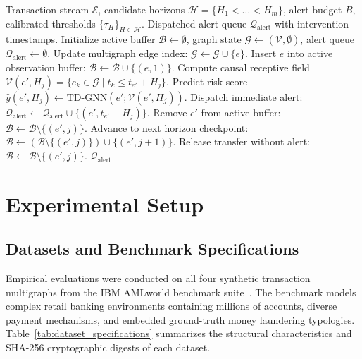 \documentclass[pdflatex,sn-mathphys,Numbered]{sn-jnl}
\theoremstyle{thmstyleone}
\theoremstyle{thmstyletwo}
\theoremstyle{thmstylethree}
\begin{document}
\begin{algorithm}[t]
\caption{Streaming Multi-Horizon Transaction Screening and Stoppable Alert Dispatching}
\label{alg:adaptive_screening}
\begin{algorithmic}[1]
\Require Transaction stream $\mathcal{E}$, candidate horizons $\mathcal{H}=\{H_1 < \dots < H_m\}$, alert budget $B$, calibrated thresholds $\{\tau_H\}_{H\in\mathcal{H}}$.
\Ensure Dispatched alert queue $\mathcal{Q}_{\text{alert}}$ with intervention timestamps.
\State Initialize active buffer $\mathcal{B} \gets \emptyset$, graph state $\mathcal{G} \gets (\mathcal{V}, \emptyset)$, alert queue $\mathcal{Q}_{\text{alert}} \gets \emptyset$.
    \State Update multigraph edge index: $\mathcal{G} \gets \mathcal{G} \cup \{e\}$.
    \State Insert $e$ into active observation buffer: $\mathcal{B} \gets \mathcal{B} \cup \{(e, 1)\}$. 
            \State Compute causal receptive field $\mathcal{V}(e', H_j) = \{e_k \in \mathcal{G} \mid t_k \le t_{e'} + H_j\}$.
            \State Predict risk score $\hat{y}(e', H_j) \gets \text{TD-GNN}(e'; \mathcal{V}(e', H_j))$.
                \State Dispatch immediate alert: $\mathcal{Q}_{\text{alert}} \gets \mathcal{Q}_{\text{alert}} \cup \{(e', t_{e'} + H_j)\}$.
                \State Remove $e'$ from active buffer: $\mathcal{B} \gets \mathcal{B} \setminus \{(e', j)\}$.
                \State Advance to next horizon checkpoint: $\mathcal{B} \gets (\mathcal{B} \setminus \{(e', j)\}) \cup \{(e', j+1)\}$.
            \Else
                \State Release transfer without alert: $\mathcal{B} \gets \mathcal{B} \setminus \{(e', j)\}$.
            \EndIf
        \EndIf
    \EndFor
\EndFor
\State \Return $\mathcal{Q}_{\text{alert}}$
\end{algorithmic}
\end{algorithm}

\section{Experimental Setup}
\label{sec:experimental_setup}

\subsection{Datasets and Benchmark Specifications}
Empirical evaluations were conducted on all four synthetic transaction multigraphs from the IBM AMLworld benchmark suite~\cite{altman2023ibmaml}. The benchmark models complex retail banking environments containing millions of accounts, diverse payment mechanisms, and embedded ground-truth money laundering typologies. Table~\ref{tab:dataset_specifications} summarizes the structural characteristics and SHA-256 cryptographic digests of each dataset.
\end{document}
